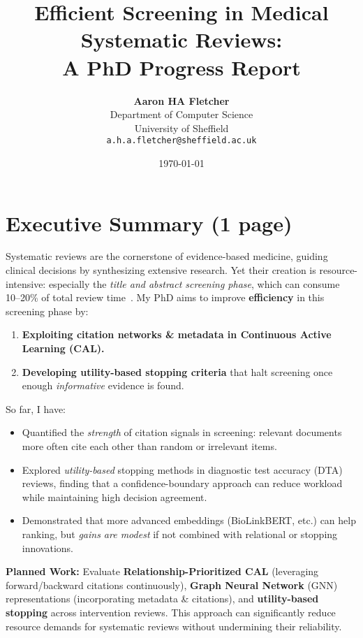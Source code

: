 \documentclass[11pt,a4paper]{article}
\title{\textbf{Efficient Screening in Medical Systematic Reviews: \\
A PhD Progress Report}}
\author{\textbf{Aaron HA Fletcher}\\
Department of Computer Science \\
University of Sheffield \\
\texttt{a.h.a.fletcher@sheffield.ac.uk}}
\date{\vspace{-1em}\small \today}
\begin{document}
\maketitle
\thispagestyle{empty}

\section*{Executive Summary (1 page)}
Systematic reviews are the cornerstone of evidence-based medicine, guiding clinical decisions by synthesizing extensive research. Yet their creation is resource-intensive: especially the \emph{title and abstract screening phase}, which can consume 10--20\% of total review time~\cite{haddaway_predicting_2019}. My PhD aims to improve \textbf{efficiency} in this screening phase by:

\begin{enumerate}[leftmargin=2em]
    \item \textbf{Exploiting citation networks \& metadata in Continuous Active Learning (CAL).}
    \item \textbf{Developing utility-based stopping criteria} that halt screening once enough \emph{informative} evidence is found.
\end{enumerate}

So far, I have:
\begin{itemize}[leftmargin=2em]
    \item Quantified the \emph{strength} of citation signals in screening: relevant documents more often cite each other than random or irrelevant items.
    \item Explored \emph{utility-based} stopping methods in diagnostic test accuracy (DTA) reviews, finding that a confidence-boundary approach can reduce workload while maintaining high decision agreement.
    \item Demonstrated that more advanced embeddings (BioLinkBERT, etc.) can help ranking, but \emph{gains are modest} if not combined with relational or stopping innovations.
\end{itemize}

\noindent
\textbf{Planned Work:} Evaluate \textbf{Relationship-Prioritized CAL} (leveraging forward/backward citations continuously), \textbf{Graph Neural Network} (GNN) representations (incorporating metadata \& citations), and \textbf{utility-based stopping} across intervention reviews. This approach can significantly reduce resource demands for systematic reviews without undermining their reliability.
\end{document}
